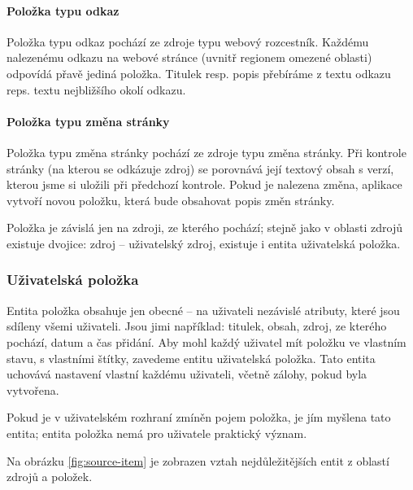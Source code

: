 \paragraph{Položka typu odkaz}

Položka typu odkaz pochází ze zdroje typu webový rozcestník.
Každému nalezenému odkazu na webové stránce (uvnitř regionem omezené oblasti) odpovídá přavě jediná položka.
Titulek resp. popis přebíráme z textu odkazu reps. textu nejbližšího okolí odkazu.

\paragraph{Položka typu změna stránky}

Položka typu změna stránky pochází ze zdroje typu změna stránky.
Při kontrole stránky (na kterou se odkázuje zdroj) se porovnává její textový obsah s verzí, kterou jsme si uložili při předchozí kontrole.
Pokud je nalezena změna, aplikace vytvoří novou položku, která bude obsahovat popis změn stránky.

\bigskip{}

Položka je závislá jen na zdroji, ze kterého pochází; stejně jako v oblasti zdrojů existuje dvojice: zdroj -- uživatelský zdroj, existuje i entita uživatelská položka.

\subsubsection{Uživatelská položka}

Entita položka obsahuje jen obecné -- na uživateli nezávislé atributy, které jsou sdíleny všemi uživateli.
Jsou jimi například: titulek, obsah, zdroj, ze kterého pochází, datum a čas přidání.
Aby mohl každý uživatel mít položku ve vlastním stavu, s vlastními štítky, zavedeme entitu uživatelská položka.
Tato entita uchovává nastavení vlastní každému uživateli, včetně zálohy, pokud byla vytvořena.

Pokud je v uživatelském rozhraní zmíněn pojem položka, je jím myšlena tato entita; entita položka nemá pro uživatele praktický význam.

\bigskip{}

Na obrázku \ref{fig:source-item} je zobrazen vztah nejdůležitějších entit z oblastí zdrojů a položek.

